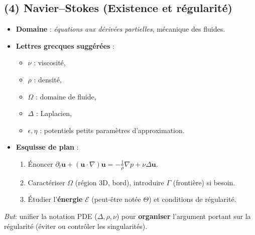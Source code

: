 \documentclass[12pt]{article}
\begin{document}
\subsection{(4) Navier--Stokes (Existence et régularité)}
\begin{itemize}
    \item \textbf{Domaine} : \emph{équations aux dérivées partielles}, mécanique des fluides.
    \item \textbf{Lettres grecques suggérées} :
    \begin{itemize}
        \item \(\nu\) : viscosité,
        \item \(\rho\) : densité, 
        \item \(\Omega\) : domaine de fluide, 
        \item \(\Delta\) : Laplacien,
        \item \(\epsilon,\eta\) : potentiels petits paramètres d’approximation.
    \end{itemize}
    \item \textbf{Esquisse de plan} :
    \begin{enumerate}
        \item Énoncer $ \partial_t \mathbf{u} + (\mathbf{u}\cdot\nabla)\mathbf{u} = -\tfrac{1}{\rho}\nabla p + \nu \Delta \mathbf{u} $.
        \item Caractériser \(\Omega\) (région 3D, bord), introduire \(\Gamma\) (frontière) si besoin.
        \item Étudier l’\textbf{énergie} \(\mathcal{E}\) (peut-être notée \(\Theta\)) et conditions de régularité.
    \end{enumerate}
\end{itemize}
\emph{But}: unifier la notation PDE (\(\Delta,\rho,\nu\)) pour \textbf{organiser} l’argument 
portant sur la régularité (éviter ou contrôler les singularités).
\end{document}
